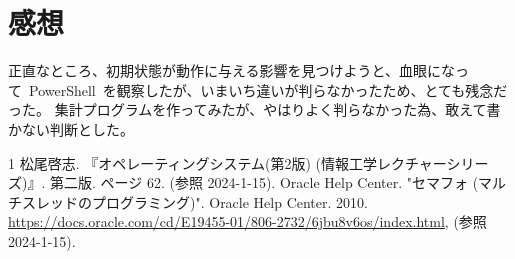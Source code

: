 \documentclass[10pt]{jarticle}
\begin{document}
\section{感想} \label{sec:kanso}
%
正直なところ、初期状態が動作に与える影響を見つけようと、血眼になって\ PowerShell\ を観察したが、いまいち違いが判らなかったため、とても残念だった。
集計プログラムを作ってみたが、やはりよく判らなかった為、敢えて書かない判断とした。
%

\begin{thebibliography}{1}
  松尾啓志. 『オペレーティングシステム(第2版) (情報工学レクチャーシリーズ)』. 第二版. ページ 62. (参照 2024-1-15).
  Oracle Help Center. "セマフォ (マルチスレッドのプログラミング)". Oracle Help Center. 2010. \\
    \url{https://docs.oracle.com/cd/E19455-01/806-2732/6jbu8v6os/index.html}, (参照 2024-1-15).
\end{thebibliography}
\end{document}
